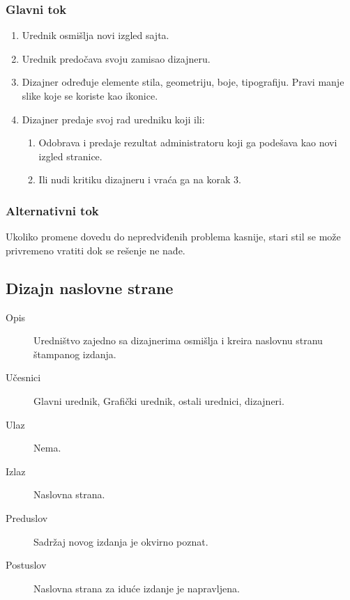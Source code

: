 \subsubsection{Glavni tok}
\begin{enumerate} 
\item Urednik osmišlja novi izgled sajta.
\item Urednik predočava svoju zamisao dizajneru.
\item Dizajner određuje elemente stila, geometriju, boje, tipografiju. Pravi manje slike koje se koriste kao ikonice.
\item Dizajner predaje svoj rad uredniku koji ili:
\begin{enumerate}
\item Odobrava i predaje rezultat administratoru koji ga podešava kao novi izgled stranice.
\item Ili nudi kritiku dizajneru i vraća ga na korak 3.
\end{enumerate}
\end{enumerate}
\subsubsection{Alternativni tok}
Ukoliko promene dovedu do nepredviđenih problema kasnije, stari stil se može privremeno vratiti dok se rešenje ne nađe.

\subsection{Dizajn naslovne strane}
\begin{description}
\item [Opis] Uredništvo zajedno sa dizajnerima osmišlja i kreira naslovnu stranu štampanog izdanja.
\item [Učesnici] Glavni urednik, Grafički urednik, ostali urednici, dizajneri.
\item [Ulaz] Nema.
\item [Izlaz] Naslovna strana.
\item [Preduslov] Sadržaj novog izdanja je okvirno poznat.
\item [Postuslov] Naslovna strana za iduće izdanje je napravljena.
\end{description}
